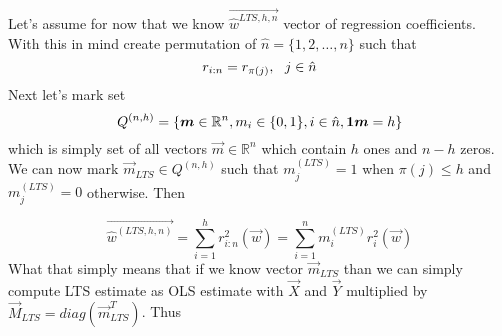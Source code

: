 

Let's assume for now that we know $\vec{\hat{w}^{LTS, h, n}}$ vector of regression coefficients. With this in mind create permutation of $\hat{n} = \{{1,2,\ldots, n\}}$ such that 
\begin{equation}
    r_{i:n} = r_{\pi(j)}\\, \ \ j \in \hat{n}
\end{equation}
Next let's mark set
 \begin{equation}
   Q^{(n,h)} = \{{\vec{m} \in \mathbb{R}^n \\, m_i \in \{{0, 1\}} \\,i \in \hat{n} \\, \vec{1}\vec{m} = h \}}
\end{equation}
which is simply set of all vectors $\vec{m} \in \mathbb{R}^n$ which contain $h$ ones and $n-h$ zeros. We can now mark $\vec{m}_{LTS} \in Q^{(n,h)}$  such that  $m^{(LTS)}_j = 1$ when $\pi(j) \leq h$ and $m^{(LTS)}_j = 0$ otherwise. Then

\begin{equation} \label{ltshat}
    \vec{\hat{w}^{(LTS, h, n)}} =  \sum\limits_{i=1}^h r_{i:n}^2(\vec{w}) =  \sum\limits_{i=1}^n 
    m^{(LTS)}_i r_{i}^2(\vec{w})
\end{equation}
What that simply means that if we know vector $\vec{m}_{LTS}$ than we can simply compute LTS estimate as OLS estimate with $\vec{X}$ and $\vec{Y}$ multiplied by $\vec{M}_{LTS} = diag(\vec{m}^T_{LTS})$. Thus 

